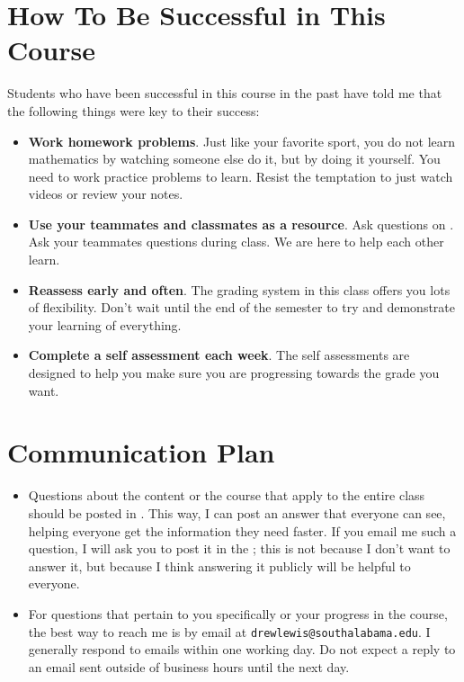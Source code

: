 \documentclass{article}
\begin{document}
\section*{\fontsize{12}{15}\selectfont How To Be Successful in This Course}
Students who have been successful in this course in the past have told me that the following things were key to their success:
\begin{itemize}
\item \textbf{Work homework problems}. Just like your favorite sport, you do not learn mathematics by watching someone else do it, but by doing it yourself. You need to work practice problems to learn. Resist the temptation to just watch videos or review your notes.
\item \textbf{Use your teammates and classmates as a resource}. Ask questions on \LMS. Ask your teammates questions during class. We are here to help each other learn.
\item \textbf{Reassess early and often}. The grading system in this class offers you lots of flexibility. Don't wait until the end of the semester to try and demonstrate your learning of everything.
\item \textbf{Complete a self assessment each week}. The self assessments are designed to help you make sure you are progressing towards the grade you want. 
\end{itemize}

\section*{\fontsize{12}{15}\selectfont Communication Plan}

\begin{itemize}
\item Questions about the content or the course that apply to the entire class should be posted in \LMS. This way, I can post an answer that everyone can see, helping everyone get the information they need faster. If you email me such a question, I will ask you to post it in the \LMS ; this is not because I don't want to answer it, but because I think answering it publicly will be helpful to everyone.
\item For questions that pertain to you specifically or your progress in the course, the best way to reach me is by email at {\tt drewlewis@southalabama.edu}. I generally respond to emails within one working day.  Do not expect a reply to an email sent outside of business hours until the next day.
\end{itemize}
\end{document}
